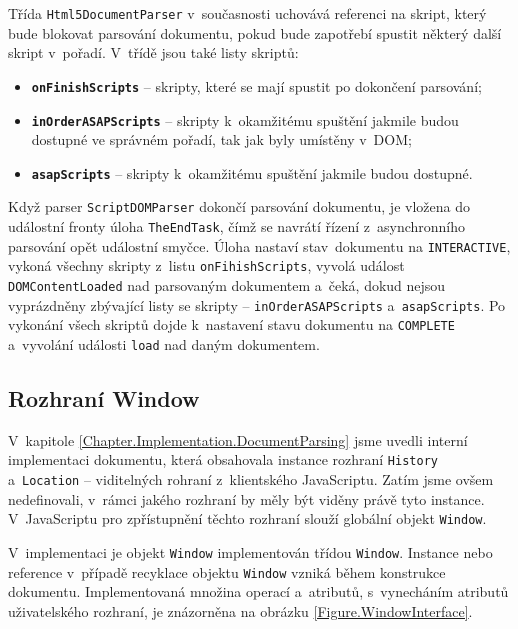 Třída \texttt{Html5DocumentParser} v~současnosti uchovává referenci na skript, který bude blokovat parsování dokumentu, pokud bude zapotřebí spustit některý další skript v~pořadí. V~třídě jsou také listy skriptů:

\begin{itemize}
  \item \textbf{\texttt{onFinishScripts}} -- skripty, které se mají spustit po dokončení parsování;
  \item \textbf{\texttt{inOrderASAPScripts}} -- skripty k~okamžitému spuštění jakmile budou dostupné ve správném pořadí, tak jak byly umístěny v~DOM;
  \item \textbf{\texttt{asapScripts}} -- skripty k~okamžitému spuštění jakmile budou dostupné. 
\end{itemize}

Když parser \texttt{ScriptDOMParser} dokončí parsování dokumentu, je vložena do událostní fronty úloha \texttt{TheEndTask}, čímž se navrátí řízení z~asynchronního parsování opět událostní smyčce. Úloha nastaví stav~dokumentu na \texttt{INTERACTIVE}, vykoná všechny skripty z~listu \texttt{onFihishScripts}, vyvolá událost \texttt{DOMContentLoaded} nad parsovaným dokumentem a~čeká, dokud nejsou vyprázdněny zbývající listy se skripty -- \texttt{inOrderASAPScripts} a~\texttt{asapScripts}. Po vykonání všech skriptů dojde k~nastavení stavu dokumentu na \texttt{COMPLETE} a~vyvolání události \texttt{load} nad daným dokumentem. 

\subsection{Rozhraní Window}
\label{Chapter.Implementation.WindowInterface}

V~kapitole \ref{Chapter.Implementation.DocumentParsing} jsme uvedli interní implementaci dokumentu, která obsahovala instance rozhraní \texttt{History} a~\texttt{Location} -- viditelných rohraní z~klientského JavaScriptu. Zatím jsme ovšem nedefinovali, v~rámci jakého rozhraní by měly být viděny právě tyto instance. V~JavaScriptu pro zpřístupnění těchto rozhraní slouží globální objekt \texttt{Window}.

V~implementaci je objekt \texttt{Window} implementován třídou \texttt{Window}. Instance nebo reference v~případě recyklace objektu \texttt{Window} vzniká během konstrukce dokumentu. Implementovaná množina operací a~atributů, s~vynecháním atributů uživatelského rozhraní, je znázorněna na obrázku \ref{Figure.WindowInterface}. 

